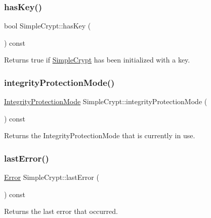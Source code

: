 \subsubsection{\texorpdfstring{hasKey()}{hasKey()}}
{\footnotesize\ttfamily bool Simple\+Crypt\+::has\+Key (\begin{DoxyParamCaption}{ }\end{DoxyParamCaption}) const\hspace{0.3cm}{\ttfamily [inline]}}

Returns true if \mbox{\hyperlink{class_simple_crypt}{Simple\+Crypt}} has been initialized with a key. \mbox{\label{class_simple_crypt_ac8940489ec63b0022335d9d6ab3b11a1}} 
\subsubsection{\texorpdfstring{integrityProtectionMode()}{integrityProtectionMode()}}
{\footnotesize\ttfamily \mbox{\hyperlink{class_simple_crypt_a42a5172e558d346b28421cc4e85feb2d}{Integrity\+Protection\+Mode}} Simple\+Crypt\+::integrity\+Protection\+Mode (\begin{DoxyParamCaption}{ }\end{DoxyParamCaption}) const\hspace{0.3cm}{\ttfamily [inline]}}

Returns the Integrity\+Protection\+Mode that is currently in use. \mbox{\label{class_simple_crypt_acb412b13386bf2bcb31552bc40949b39}} 
\subsubsection{\texorpdfstring{lastError()}{lastError()}}
{\footnotesize\ttfamily \mbox{\hyperlink{class_simple_crypt_ab7f81049e78f021b55a36f7cfac5a09b}{Error}} Simple\+Crypt\+::last\+Error (\begin{DoxyParamCaption}{ }\end{DoxyParamCaption}) const\hspace{0.3cm}{\ttfamily [inline]}}

Returns the last error that occurred. \mbox{\label{class_simple_crypt_adc6c6355aa276c0d3516f7ad273f063b}} 
